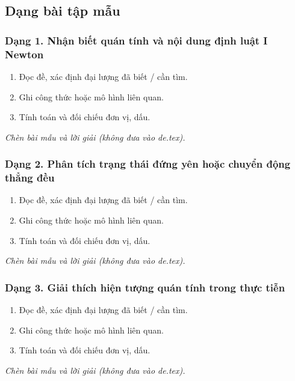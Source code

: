 

\subsection{Dạng bài tập mẫu}
\subsubsection{Dạng 1. Nhận biết quán tính và nội dung định luật I Newton}
\begin{phuongphap}
\begin{enumerate}
\item Đọc đề, xác định đại lượng đã biết / cần tìm.
\item Ghi công thức hoặc mô hình liên quan.
\item Tính toán và đối chiếu đơn vị, dấu.
\end{enumerate}
\end{phuongphap}
\begin{vidumau}
\textit{Chèn bài mẫu và lời giải (không đưa vào de.tex).}
\end{vidumau}

\subsubsection{Dạng 2. Phân tích trạng thái đứng yên hoặc chuyển động thẳng đều}
\begin{phuongphap}
\begin{enumerate}
\item Đọc đề, xác định đại lượng đã biết / cần tìm.
\item Ghi công thức hoặc mô hình liên quan.
\item Tính toán và đối chiếu đơn vị, dấu.
\end{enumerate}
\end{phuongphap}
\begin{vidumau}
\textit{Chèn bài mẫu và lời giải (không đưa vào de.tex).}
\end{vidumau}

\subsubsection{Dạng 3. Giải thích hiện tượng quán tính trong thực tiễn}
\begin{phuongphap}
\begin{enumerate}
\item Đọc đề, xác định đại lượng đã biết / cần tìm.
\item Ghi công thức hoặc mô hình liên quan.
\item Tính toán và đối chiếu đơn vị, dấu.
\end{enumerate}
\end{phuongphap}
\begin{vidumau}
\textit{Chèn bài mẫu và lời giải (không đưa vào de.tex).}
\end{vidumau}

